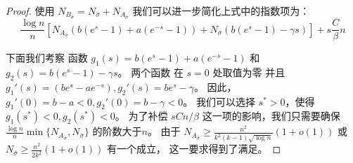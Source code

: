 \begin{proof}
    使用 $N_{B_{\bar{\sigma}}} = N_{\bar{\sigma}} + N_{A_{\bar{\sigma}}}$
    我们可以进一步简化上式中的指数项为：
    $$
    \frac{\log n}{n} [N_{A_{\bar{\sigma}}}(b(e^s -1)+ a(e^{-s} - 1)) +
    N_{\bar{\sigma}} (b(e^s - 1)-\gamma s)]  + s \frac{C}{\beta}n
    $$
    
    下面我们考察 函数 $g_1(s) = b(e^s -1)+ a(e^{-s} - 1)$
    和 $g_2(s) = b(e^s - 1)-\gamma s$。
    两个函数 在 $s=0$ 处取值为零
    并且 $g_1'(s) = (be^s - ae^{-s}), g_2'(s) = be^s -\gamma$。
    因此， $g_1'(0) = b-a<0, g_2'(0) = b - \gamma < 0$。
    我们可以选择 $s^*>0$，使得 $g_1(s^*) < 0,g_2(s^*) < 0$。
    为了补偿 $sCn/\beta$ 这一项的影响，我们只需要确保
    $\frac{\log n}{n} \min\{N_{A_{\bar{\sigma}}}, N_{\bar{\sigma}}\}$ 的阶数大于$n$。
    由于   $N_{A_{\bar{\sigma}}}\geq \frac{n^2}{k^2 (k-1)\sqrt{\log n}}(1+o(1))$ 或 $N_{\bar{\sigma}} \geq \frac{n^2}{2k^2}(1+o(1))$
    有一个成立，
    这一要求得到了满足。
  \end{proof}

